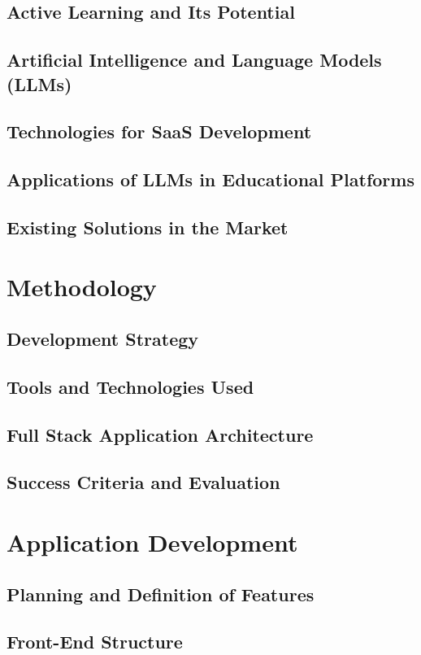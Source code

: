 \documentclass[tcc,capa]{texufpel}
\begin{document}
\section{Active Learning and Its Potential}
\section{Artificial Intelligence and Language Models (LLMs)}
\section{Technologies for SaaS Development}
\section{Applications of LLMs in Educational Platforms}
\section{Existing Solutions in the Market}

\chapter{Methodology}
\section{Development Strategy}
\section{Tools and Technologies Used}
\section{Full Stack Application Architecture}
\section{Success Criteria and Evaluation}

\chapter{Application Development}
\section{Planning and Definition of Features}
\section{Front-End Structure}
\end{document}
